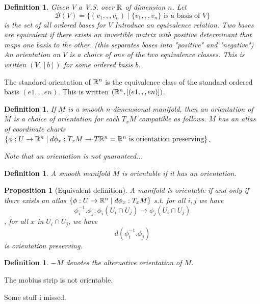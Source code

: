 \documentclass[11pt]{amsbook}
\newenvironment{dateenv}{
	\vspace{1em}
}{
	\vspace{1em}
}
\newcommand{\mydate}[4]{
	\newdate{#1}{#2}{#3}{#4}
	\begin{dateenv}
		\hfill\displaydate{#1}
	\end{dateenv}
}
\theoremstyle{mystyle} \newtheorem{thrm}[thm]{Theorem}
\theoremstyle{mystyle} \newtheorem{defi}[thm]{Definition}
\theoremstyle{mystyle} \newtheorem{coro}[thm]{Corollary}
\theoremstyle{mystyle} \newtheorem{propo}[thm]{Proposition}
\theoremstyle{mystyle} \newtheorem{lemm}[thm]{Lemma}
\numberwithin{thm}{section}
\newcommand{\de}{\emph}
\begin{document}
\begin{defi}
	Given $V$ a V.S. over ${\mathbb R}$ of dimension $n$.
	Let $$\mathcal{B}(V) = \{ (v_1,,,v_n) \mid \{v_1,,,v_n\} \text{ is a basis of } V \}$$ is the set of all ordered bases for $V$
	Introduce an equivalence relation.  Two bases are equivalent if there exists an invertible matrix with positive determinant that maps one basis to the other.   (this separates bases into "positive" and "negative")
	An \de{orientation} on $V$ is a choice of one of the two equivalence classes.  This is written $(V, [b])$ for some ordered basis $b$.
\end{defi}
\begin{example}
	The standard orientation of ${\mathbb R}^n$ is the equivalence class of the standard ordered basis $(e1,,,en)$.  This is written $({\mathbb R}^n, [(e1,,,en)])$.
\end{example}
\begin{defi}
	If $M$ is a smooth $n$-dimensional manifold, then an \de{orientation} of $M$ is a choice of orientation for each $T_xM$ compatible as follows.  $M$ has an atlas of coordinate charts $\{ \phi : U \to {\mathbb R}^n \mid d\phi_x : T_xM \to T{\mathbb R}^n = {\mathbb R}^n \text{ is orientation preserving} \}$.

	Note that an orientation is not guaranteed...
\end{defi}
\begin{defi}
	A smooth manifold $M$ is \de{orientable} if it has an orientation.
\end{defi}
\begin{propo}[Equivalent definition]
	A manifold is orientable if and only if there exists an atlas $\{ \phi : U \to {\mathbb R}^n \mid d\phi_x : T_xM \}$ s.t. for all $i,j$ we have $$\phi_i^{-1}.\phi_j : \phi_i(U_i \cap U_j) \to \phi_j(U_i \cap U_j)$$
	, for all $x$ in $U_i \cap U_j$, we have $$d(\phi_i^{-1}.\phi_j)$$ is orientation preserving.
\end{propo}
\begin{defi}
	$-M$ denotes the alternative orientation of $M$.
\end{defi}
\begin{example}
	The mobius strip is not orientable.
\end{example}

\mydate{d14}{16}{11}{2016}

Some stuff i missed.
\end{document}
